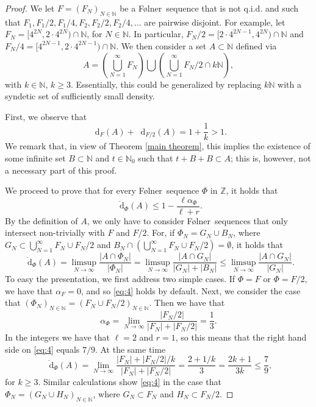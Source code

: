 \documentclass[reqno]{amsart}
\def\Z{{\mathbb Z}}
\def\N{{\mathbb N}}
\newcommand*\diff{\mathop{}\!\mathrm{d}}
\theoremstyle{definition}
\theoremstyle{remark}
\theoremstyle{remark}
\def\N{{\mathbb N}}
\newcommand{\Folner}{F\o{}lner}
\begin{document}
\begin{proof}
We let $F=(F_N)_{N\in \N}$ be a \Folner\ sequence that is 
not q.i.d. and such that $F_1,F_1/2,F_1/4,F_2,F_2/2,F_2/4,\ldots$ are pairwise disjoint. For example, let $F_N=[4^{2N},2\cdot 4^{2N})\cap \N$, for 
$N\in \N$. In particular, $F_N/2=[2\cdot 4^{2N-1},4^{2N})\cap \N$ and $F_N/4=[4^{2N-1},2\cdot 4^{2N-1})\cap \N$. We 
then consider a set $A\subset \N$ defined via 
$$A= \left(\bigcup_{N=1}^{\infty} F_N\right) \bigcup \left( \bigcup_{N=1}^{\infty} F_N/2 \cap k\N \right),$$
with $k\in \N$, $k\geq 3$. Essentially, this could 
be generalized by replacing $k\N$ with a syndetic set of 
sufficiently small density. 

First, we observe that 
$$\diff_{F}(A)+\diff_{F/2}(A)=1+\frac{1}{k}>1.$$ 
We remark that, in view of Theorem \ref{main theorem}, this 
implies the existence of some infinite set $B\subset \N$ and 
$t\in \N_0$ such that $t+B+B \subset A$; this is, however, 
not a necessary part of this proof. 

We proceed to prove that for every \Folner\ sequence $\Phi$ 
in 
$\Z$, it holds that 
\begin{equation}\label{eq:4} 
\overline{\diff}_{\Phi}(A) \leq 1-\frac{\ell \alpha_{\Phi}}{\ell+r}.    
\end{equation}
By the definition of $A$, we only have to consider \Folner\ 
sequences that only intersect non-trivially with $F$ and 
$F/2$. For, if $\Phi_N= G_N \cup B_N$, where $G_N \subset \bigcup_{N=1}^{\infty} F_{N}\cup F_{N}/2$ and $B_N\cap \left(\bigcup_{N=1}^{\infty} F_{N}\cup F_{N}/2\right)=\emptyset$, it holds that
$$\overline{\diff}_{\Phi}(A)=\limsup_{N\to \infty} \frac{|A\cap \Phi_N|}{|\Phi_N|}= \limsup_{N\to \infty} \frac{|A\cap G_N|}{|G_N|+|B_N|} \leq \limsup_{N\to \infty} \frac{|A\cap G_N|}{|G_N|}.$$
To easy the presentation, we first address two simple cases.
If $\Phi=F$ or $\Phi=F/2$, we have that $\alpha_{F}=0$, and 
so \eqref{eq:4} holds by default. Next, we consider the case that $(\Phi_N)_{N\in \N}=(F_N\cup F_N/2)_{N\in \N}$. Then we have 
that 
$$\alpha_{\Phi}= \lim_{N\to \infty} 
\frac{|F_N/2|}{|F_N|+|F_N/2|}=\frac{1}{3}.$$
In the integers we have that $\ell=2$ and $r=1$, so this means 
that the right hand side on \eqref{eq:4} equals $7/9$. At the 
same time 
$$\overline{\diff}_{\Phi}(A)=\lim_{N\to \infty} \frac{|F_N|+|F_N/2|/k}{|F_N|+|F_N/2|} = \frac{2+1/k}{3}=\frac{2k+1}{3k} \leq \frac{7}{9}, $$
for $k\geq 3$.
Similar calculations show \eqref{eq:4} in the case that 
$\Phi_N=(G_N \cup H_N)_{N\in \N}$, where $G_N\subset F_N$ and $H_N\subset F_N/2$.


\end{proof}
\end{document}
